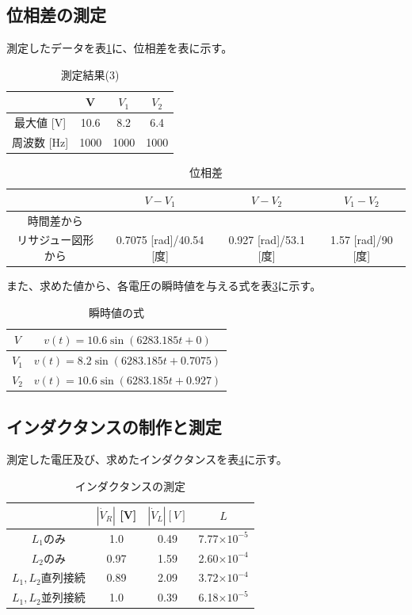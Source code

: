 \documentclass[dvipdfmx]{jsarticle}
\begin{document}
\subsection{位相差の測定}
測定したデータを表\ref{tb:result6}に、位相差を表に示す。
\begin{table}
  \centering
  \caption{測定結果(3)}
  \label{tb:result6}
  \begin{tabular}{|c|c|c|c|}\hline
    & V & $V_1$ & $V_2$ \\ \hline
    最大値 [V] & 10.6 & 8.2 & 6.4\\ \hline
    周波数 [Hz] & 1000 & 1000 & 1000\\ \hline 
  \end{tabular}
\end{table}

\begin{table}
  \centering
  \caption{位相差}
  \label{tb:result7}
  \begin{tabular}{|c|c|c|c|}\hline
    & $V-V_1$ & $V-V_2$ & $V_1-V_2$ \\ \hline
    時間差から & & &\\ \hline
    リサジュー図形から & 0.7075 [rad]/40.54 [度] & 0.927 [rad]/53.1 [度] & 1.57 [rad]/90 [度]\\ \hline
  \end{tabular}
\end{table}

また、求めた値から、各電圧の瞬時値を与える式を表\ref{tb:result8}に示す。

\begin{table}[h]
  \centering
  \caption{瞬時値の式}
  \label{tb:result8}
  \begin{tabular}{|c|c|}\hline
    $V$ & $v(t) = 10.6\sin(6283.185t + 0)$ \\ \hline
    $V_1$ & $v(t) = 8.2\sin(6283.185t + 0.7075)$ \\ \hline
    $V_2$ & $v(t) = 10.6\sin(6283.185t + 0.927)$ \\ \hline
  \end{tabular}
\end{table}

\subsection{インダクタンスの制作と測定}
測定した電圧及び、求めたインダクタンスを表\ref{tb:result9}に示す。

\begin{table}[h]
  \centering
  \caption{インダクタンスの測定}
  \label{tb:result9}
  \begin{tabular}{|c|c|c|c|}\hline
    & $|\dot V_R|$ [V] & $|\dot V_L| [V]$ & $L$\\ \hline
    $L_1$のみ & 1.0 & 0.49 & 7.77$\times 10^{-5}$\\ \hline
    $L_2$のみ & 0.97 & 1.59 & 2.60$\times 10^{-4}$\\ \hline
    $L_1, L_2$直列接続 & 0.89 & 2.09 & 3.72$\times 10^{-4}$\\ \hline
    $L_1, L_2$並列接続 & 1.0 & 0.39 & 6.18$\times 10^{-5}$\\ \hline
  \end{tabular}
\end{table}
\end{document}
